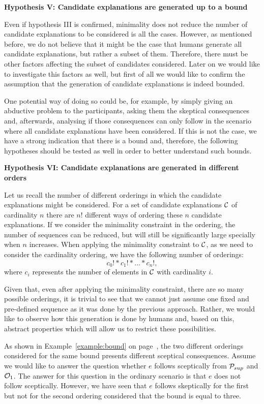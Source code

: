 \textbf{Hypothesis V: Candidate explanations are generated up to a bound}

Even if hypothesis III is confirmed, minimality does not reduce the number of candidate explanations to be considered is all the cases. However, as mentioned before, we do not believe that it might be the case that humans generate all candidate explanations, but rather a subset of them. Therefore, there must be other factors affecting the subset of candidates considered. Later on we would like to investigate this factors as well, but first of all we would like to confirm the assumption that the generation of candidate explanations is indeed bounded.

One potential way of doing so could be, for example, by simply giving an abductive problem to the participants, asking them the skeptical consequences and, afterwards, analysing if those consequences can only follow in the scenario where all candidate explanations have been considered. If this is not the case, we have a strong indication that there is a bound and, therefore, the following hypotheses should be tested as well in order to better understand such bounds.

\textbf{Hypothesis VI: Candidate explanations are generated in different orders}

Let us recall the number of different orderings in which the candidate explanations might be considered. For a set of candidate explanations $\mathcal{C}$ of cardinality $n$ there are $n!$ different ways of ordering these $n$ candidate explanations. If we consider the minimality constraint in the ordering, the number of sequences can be reduced, but will still be significantly large specially when $n$ increases. When applying the minimality constraint to $\mathcal{C}$, as we need to consider the cardinality ordering, we have the following number of orderings: 
\[
c_0! * c_1! * \dots * c_n!,
\]
where $c_i$ represents the number of elements in $\mathcal{C}$ with cardinality $i$. 

Given that, even after applying the minimality constraint, there are so many possible orderings, it is trivial to see that we cannot just assume one fixed and pre-defined sequence as it was done by the previous approach. Rather, we would like to observe how this generation is done by humans and, based on this, abstract properties which will allow us to restrict these possibilities.

As shown in Example~\ref{example:bound} on page~\pageref{example:bound}, the two different orderings considered for the same bound presents different sceptical consequences. Assume we would like to answer the question whether $e$ follows sceptically from $\mathcal{P}_{sup}$ and $\mathcal{O}_1$. The answer for this question in the ordinary scenario is that $e$ does not follow sceptically. However, we have seen that $e$ follows skeptically for the first but not for the second ordering considered that the bound is equal to three.

